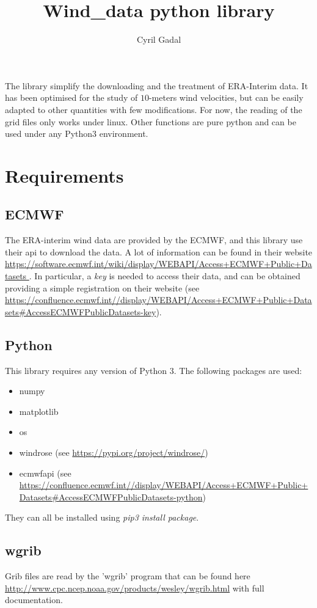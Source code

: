 \documentclass[12pt]{article}
\author{Cyril Gadal}
\title{Wind\_data python library}
\begin{document}
\maketitle


The library simplify the downloading and the treatment of ERA-Interim data. It has been optimised for the study of $10$-meters wind velocities, but can be easily adapted to other quantities with few modifications. For now, the reading of the grid files only works under linux. Other functions are pure python and can be used under any Python3 environment.

\section{Requirements}
\subsection{ECMWF}
The ERA-interim wind data are provided by the ECMWF, and this library use their api to download the data. A lot of information can be found in their website \url{https://software.ecmwf.int/wiki/display/WEBAPI/Access+ECMWF+Public+Datasets
}. In particular, a \emph{key} is needed to access their data, and can be obtained providing a simple registration on their website (see \url{https://confluence.ecmwf.int//display/WEBAPI/Access+ECMWF+Public+Datasets#AccessECMWFPublicDatasets-key}).

\subsection{Python}
This library requires any version of Python 3. The following packages are used:
\begin{itemize}
\item numpy
\item matplotlib
\item os
\item windrose (see \url{https://pypi.org/project/windrose/})
\item ecmwfapi (see \url{https://confluence.ecmwf.int//display/WEBAPI/Access+ECMWF+Public+Datasets#AccessECMWFPublicDatasets-python})
\end{itemize}
They can all be installed using \textit{pip3 install package}.

\subsection{wgrib}
Grib files are read by the 'wgrib' program that can be found here \url{http://www.cpc.ncep.noaa.gov/products/wesley/wgrib.html} with full documentation.
\end{document}
